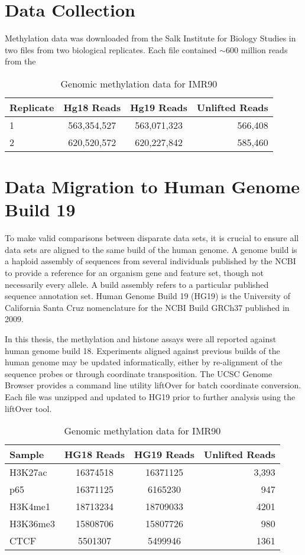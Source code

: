 \chapter{Data Collection}

Methylation data was downloaded from the Salk Institute for Biology Studies in
two files from two biological replicates.  Each file contained $\sim600$ million
reads from the

\begin{table}
  \centering
  \begin{tabular}{lccr}
    \hline
    Replicate & Hg18 Reads & Hg19 Reads & Unlifted Reads \\ \hline
    1 & 563,354,527 & 563,071,323 & 566,408 \\
    2 & 620,520,572 & 620,227,842 & 585,460 \\
    \hline
  \end{tabular}
  \caption{Genomic methylation data for IMR90}
\end{table}

\chapter{Data Migration to Human Genome Build 19}

To make valid comparisons between disparate data sets, it is crucial to ensure all data sets are aligned to the same
build of the human genome.  A genome build is a haploid assembly of sequences from several individuals published by
the NCBI to provide a reference for an organism gene and feature set, though not necessarily every allele.  A build assembly
refers to a particular published sequence annotation set.  Human Genome Build 19 (HG19) is the University of California Santa
Cruz nomenclature for the NCBI Build GRCh37 published in 2009\cite{2001Initial}.

In this thesis, the methylation and histone assays were all reported against human genome build 18.  Experiments aligned
against previous builds of the human genome may be updated informatically, either by re-alignment of the
sequence probes or through coordinate transposition.  The UCSC Genome Browser provides a command line utility liftOver for
batch coordinate conversion.  Each file was unzipped and updated to HG19 prior to further analysis using the liftOver tool.

\begin{table}
  \centering
  \begin{tabular}{lccr}
    \hline
    Sample & HG18 Reads & HG19 Reads & Unlifted Reads \\ \hline
    H3K27ac & 16374518 & 16371125 & 3,393 \\
    p65 & 16371125 & 6165230 & 947 \\
    H3K4me1 & 18713234 & 18709033 & 4201 \\
    H3K36me3 & 15808706 & 15807726 & 980 \\
    CTCF & 5501307 & 5499946 & 1361 \\
    \hline
  \end{tabular}
  \caption{Genomic methylation data for IMR90}
\end{table}

